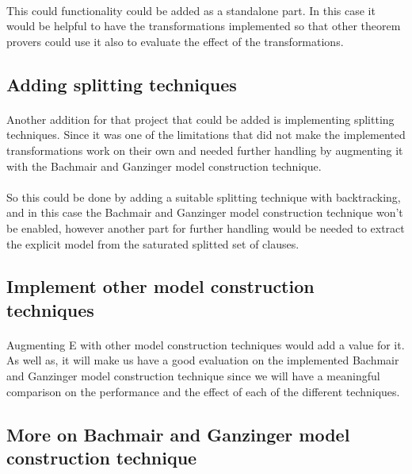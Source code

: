 			\paragraph{}
			This could functionality could be added as a standalone part. In this case it would be helpful to have the transformations implemented so that other theorem provers could use it also to evaluate the effect of the transformations.

		\subsection{Adding splitting techniques}\label{sub:c7s1s2}
			\paragraph{ }
			Another addition for that project that could be added is implementing splitting techniques. Since it was one of the limitations that did not make the implemented transformations work on their own and needed further handling by augmenting it with the Bachmair and Ganzinger model construction technique.
			
			\paragraph{ }
			So this could be done by adding a suitable splitting technique with backtracking, and in this case the Bachmair and Ganzinger model construction technique won't be enabled, however another part for further handling would be needed to extract the explicit model from the saturated splitted set of clauses.  

		\subsection{Implement other model construction techniques}\label{sub:c7s1s3}
			\paragraph{ }
			Augmenting E with other model construction techniques would add a value for it. As well as, it will make us have a good evaluation on the implemented Bachmair and Ganzinger model construction technique since we will have a meaningful comparison on the performance and the effect of each of the different techniques.
		
		\subsection{More on Bachmair and Ganzinger model construction technique}\label{sub:c7s1s4}
